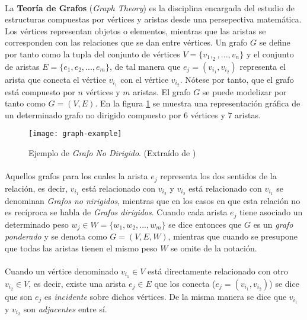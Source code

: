 \documentclass{subfiles}
\begin{document}
      \paragraph{}
      La \textbf{Teoría de Grafos} (\emph{Graph Theory}) es la disciplina encargada del estudio de estructuras compuestas por vértices y aristas desde una persepectiva matemática. Los vértices representan objetos o elementos, mientras que las aristas se corresponden con las relaciones que se dan entre vértices. Un grafo $G$ se define por tanto como la tupla del conjunto de vértices $V = \{ v_1, _2, ..., v_n \}$ y el conjunto de aristas $E = \{ e_1, e_2, ..., e_m \}$, de tal manera que $e_j = (v_{i_1}, v_{i_2})$ representa el arista que conecta el vértice $v_{i_1}$ con el vértice $v_{i_2}$. Nótese por tanto, que el grafo está compuesto por $n$ vértices y $m$ aristas. El grafo $G$ se puede modelizar por tanto como $G = (V, E)$. En la figura \ref{img:graph_example} se muestra una representación gráfica de un determinado grafo no dirigido compuesto por $6$ vértices y $7$ aristas.

      \begin{figure}
        \centering
        \texttt{[image: graph-example]}
        \caption{Ejemplo de \emph{Grafo No Dirigido}. (Extraído de \cite{wiki:Graph_(discrete_mathematics)})}
        \label{img:graph_example}
      \end{figure}

      \paragraph{}
      Aquellos grafos para los cuales la arista $e_j$ representa los dos sentidos de la relación, es decir, $v_{i_1}$ está relacionado con $v_{i_2}$ y $v_{i_2}$ está relacionado con $v_{i_1}$ se denominan \emph{Grafos no nirigidos}, mientras que en los casos en que esta relación no es recíproca se habla de \emph{Grafos dirigidos}. Cuando cada arista $e_j$ tiene asociado un determinado peso $w_j \in W =  \{ w_1, w_2, ..., w_m\}$ se dice entonces que $G$ es un \emph{grafo ponderado} y se denota como $G=(V, E, W)$, mientras que cuando se presupone que todas las aristas tienen el mismo peso $W$ se omite de la notación.

      \paragraph{}
      Cuando un vértice denominado $v_{i_1} \in V$ está directamente relacionado con otro $v_{i_2} \in V$, es decir, existe una arista $e_j \in E$ que los conecta ($e_j = (v_{i_1}, v_{i_2})$) se dice que son $e_j$ es \emph{incidente} sobre dichos vértices. De la misma manera se dice que $v_{i_1}$ y $v_{i_2}$ son \emph{adjacentes} entre sí.
\end{document}
